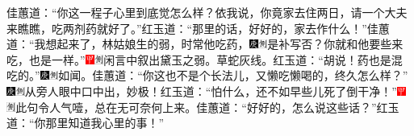 佳蕙道：“你这一程子心里到底觉怎么样？依我说，你竟家去住两日，请一个大夫来瞧瞧，吃两剂药就好了。”红玉道：“那里的话，好好的，家去作什么！”佳蕙道：“我想起来了，林姑娘生的弱，时常他吃药，{\includegraphics[width=3mm]{../Images/00004}\includegraphics[width=3mm]{../Images/00011}\footnotesize \kaishu 是补写否？}你就和他要些来吃，也是一样。”{\includegraphics[width=3mm]{../Images/00002}\includegraphics[width=3mm]{../Images/00011}\footnotesize \kaishu 闲言中叙出黛玉之弱。草蛇灰线。}红玉道：“胡说！药也是混吃的。”{\includegraphics[width=3mm]{../Images/00004}\includegraphics[width=3mm]{../Images/00011}\footnotesize \kaishu 如闻。}佳蕙道：“你这也不是个长法儿，又懒吃懒喝的，终久怎么样？”{\includegraphics[width=3mm]{../Images/00004}\includegraphics[width=3mm]{../Images/00011}\footnotesize \kaishu 从旁人眼中口中出，妙极！}红玉道：“怕什么，还不如早些儿死了倒干净！”{\includegraphics[width=3mm]{../Images/00002}\includegraphics[width=3mm]{../Images/00011}\footnotesize \kaishu 此句令人气噎，总在无可奈何上来。}佳蕙道：“好好的，怎么说这些话？”红玉道：“你那里知道我心里的事！”

